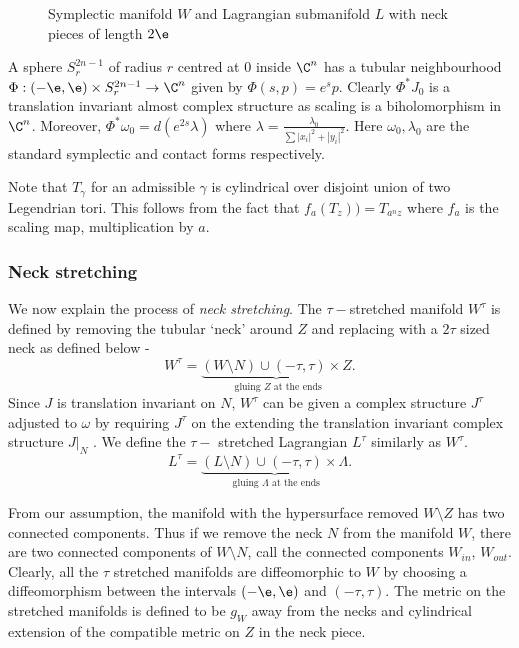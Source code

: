 \begin{figure}[ht]
    \centering
    \caption{Symplectic manifold $W$ and Lagrangian submanifold $L$ with neck pieces of length $2\e$}
    \label{fig:sftsetup}
\end{figure}


\begin{example}
A sphere $S^{2n-1}_r$ of radius $r$ centred at $0$ inside $\C^n$ has a tubular neighbourhood $\Phi : (-\e,\e) \times S^{2n-1}_r \to \C^n $ given by $\Phi(s,p)= e^sp$. Clearly $\Phi^*J_0$ is a translation invariant almost complex structure as scaling is a biholomorphism in $\C^n$. Moreover, $\Phi^*\omega_0 =  d(e^{2s}\lambda)$ where $\lambda = \frac{\lambda_0}{\sum |x_i|^2 + |y_i|^2}$. Here $\omega_0,\lambda_0$ are the standard symplectic and contact forms respectively. 

Note that $T_\gamma$ for an admissible $\gamma$ is cylindrical over disjoint union of two Legendrian tori. This follows from the fact that $f_a(T_z)) = T_{a^nz}$ where $f_a$ is the scaling map, multiplication by $a$.
\end{example}

\subsubsection{Neck stretching}
We now explain the process of \textit{neck stretching}. The $\tau-$stretched manifold $W^\tau$ is defined by removing the tubular `neck' around $Z$ and replacing with a $2\tau$ sized neck as defined below - 
$$W^\tau =  \underbrace{(W \setminus N ) \cup   (-\tau,\tau)\times Z} _{\text{ gluing $Z$ at the ends}}. $$
Since $J$ is translation invariant on $ N$, $W^\tau$ can be given a complex structure $J^\tau$ adjusted to $\omega$   by requiring $J^\tau$ on the extending the translation invariant complex structure $J|_N$ . We define the $\tau-$ stretched Lagrangian $L^\tau$ similarly as $W^\tau$.
$$L^\tau =  \underbrace{(L \setminus N ) \cup   (-\tau,\tau)\times \Lambda} _{\text{ gluing $\Lambda$ at the ends}} .$$

\noindent From our assumption, the manifold with the hypersurface removed $W\setminus Z$ has two connected components. Thus if we remove the neck $N$ from the manifold $W$, there are two connected components of $W \setminus N$,   call the connected components  $W_{in}$, $W_{out}$. Clearly, all the $\tau$ stretched manifolds are diffeomorphic to $W$ by choosing a diffeomorphism between the intervals $(-\e,\e)$ and $(-\tau,\tau)$. The metric on the stretched manifolds is defined to be $g_W$ away from the necks and cylindrical extension of the compatible metric on $Z$ in the neck piece.


